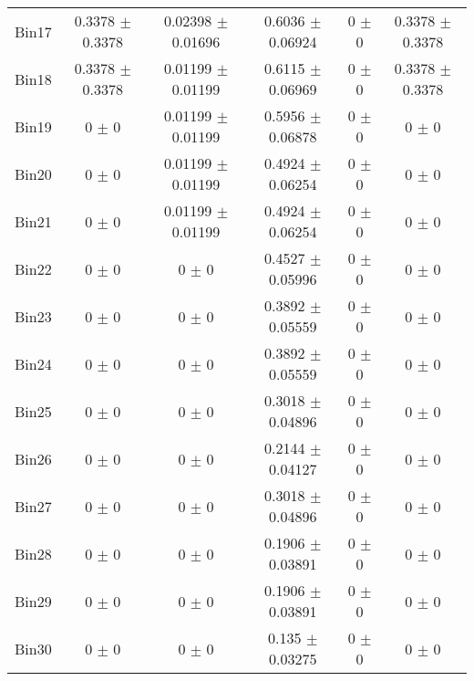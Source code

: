 \begin{tabular}{@{\extracolsep{4pt}}lccccc@{}}
     Bin17 & 0.3378 $\pm$ 0.3378 & 0.02398 $\pm$ 0.01696 & 0.6036 $\pm$ 0.06924 & 0 $\pm$ 0 & 0.3378 $\pm$ 0.3378 \\ 
     Bin18 & 0.3378 $\pm$ 0.3378 & 0.01199 $\pm$ 0.01199 & 0.6115 $\pm$ 0.06969 & 0 $\pm$ 0 & 0.3378 $\pm$ 0.3378 \\ 
     Bin19 & 0 $\pm$ 0 & 0.01199 $\pm$ 0.01199 & 0.5956 $\pm$ 0.06878 & 0 $\pm$ 0 & 0 $\pm$ 0 \\ 
     Bin20 & 0 $\pm$ 0 & 0.01199 $\pm$ 0.01199 & 0.4924 $\pm$ 0.06254 & 0 $\pm$ 0 & 0 $\pm$ 0 \\ 
     Bin21 & 0 $\pm$ 0 & 0.01199 $\pm$ 0.01199 & 0.4924 $\pm$ 0.06254 & 0 $\pm$ 0 & 0 $\pm$ 0 \\ 
     Bin22 & 0 $\pm$ 0 & 0 $\pm$ 0 & 0.4527 $\pm$ 0.05996 & 0 $\pm$ 0 & 0 $\pm$ 0 \\ 
     Bin23 & 0 $\pm$ 0 & 0 $\pm$ 0 & 0.3892 $\pm$ 0.05559 & 0 $\pm$ 0 & 0 $\pm$ 0 \\ 
     Bin24 & 0 $\pm$ 0 & 0 $\pm$ 0 & 0.3892 $\pm$ 0.05559 & 0 $\pm$ 0 & 0 $\pm$ 0 \\ 
     Bin25 & 0 $\pm$ 0 & 0 $\pm$ 0 & 0.3018 $\pm$ 0.04896 & 0 $\pm$ 0 & 0 $\pm$ 0 \\ 
     Bin26 & 0 $\pm$ 0 & 0 $\pm$ 0 & 0.2144 $\pm$ 0.04127 & 0 $\pm$ 0 & 0 $\pm$ 0 \\ 
     Bin27 & 0 $\pm$ 0 & 0 $\pm$ 0 & 0.3018 $\pm$ 0.04896 & 0 $\pm$ 0 & 0 $\pm$ 0 \\ 
     Bin28 & 0 $\pm$ 0 & 0 $\pm$ 0 & 0.1906 $\pm$ 0.03891 & 0 $\pm$ 0 & 0 $\pm$ 0 \\ 
     Bin29 & 0 $\pm$ 0 & 0 $\pm$ 0 & 0.1906 $\pm$ 0.03891 & 0 $\pm$ 0 & 0 $\pm$ 0 \\ 
     Bin30 & 0 $\pm$ 0 & 0 $\pm$ 0 & 0.135 $\pm$ 0.03275 & 0 $\pm$ 0 & 0 $\pm$ 0 \\ 
\hline\hline
  \end{tabular}
